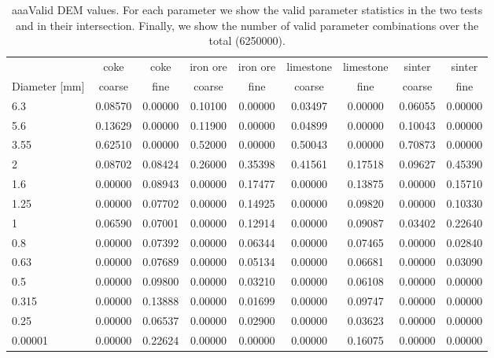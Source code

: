 \begin{table}%
\centering
\begin{tabular}{lcccccccc}
\hline
          & coke  & coke  & iron ore & iron ore & limestone & limestone & sinter & sinter \\
    Diameter [mm] & coarse & fine  & coarse & fine  & coarse & fine  & coarse & fine \\
          \hline

    6.3   & 0.08570 & 0.00000 & 0.10100 & 0.00000 & 0.03497 & 0.00000 & 0.06055 & 0.00000 \\
    5.6   & 0.13629 & 0.00000 & 0.11900 & 0.00000 & 0.04899 & 0.00000 & 0.10043 & 0.00000 \\
    3.55  & 0.62510 & 0.00000 & 0.52000 & 0.00000 & 0.50043 & 0.00000 & 0.70873 & 0.00000 \\
    2     & 0.08702 & 0.08424 & 0.26000 & 0.35398 & 0.41561 & 0.17518 & 0.09627 & 0.45390 \\
    1.6   & 0.00000 & 0.08943 & 0.00000 & 0.17477 & 0.00000 & 0.13875 & 0.00000 & 0.15710 \\
    1.25  & 0.00000 & 0.07702 & 0.00000 & 0.14925 & 0.00000 & 0.09820 & 0.00000 & 0.10330 \\
    1     & 0.06590 & 0.07001 & 0.00000 & 0.12914 & 0.00000 & 0.09087 & 0.03402 & 0.22640 \\
    0.8   & 0.00000 & 0.07392 & 0.00000 & 0.06344 & 0.00000 & 0.07465 & 0.00000 & 0.02840 \\
    0.63  & 0.00000 & 0.07689 & 0.00000 & 0.05134 & 0.00000 & 0.06681 & 0.00000 & 0.03090 \\
    0.5   & 0.00000 & 0.09800 & 0.00000 & 0.03210 & 0.00000 & 0.06108 & 0.00000 & 0.00000 \\
    0.315 & 0.00000 & 0.13888 & 0.00000 & 0.01699 & 0.00000 & 0.09747 & 0.00000 & 0.00000 \\
    0.25  & 0.00000 & 0.06537 & 0.00000 & 0.02900 & 0.00000 & 0.03623 & 0.00000 & 0.00000 \\
    0.00001 & 0.00000 & 0.22624 & 0.00000 & 0.00000 & 0.00000 & 0.16075 & 0.00000 & 0.00000 \\ 

\hline
\end{tabular}
\caption[aaaValid DEM values]{aaaValid DEM values. For each parameter we show
the valid parameter statistics in the two tests and in their intersection.
Finally, we show the number of valid parameter combinations over the total
(6250000).}
\label{tab:19particlesizedistributions}
\end{table}